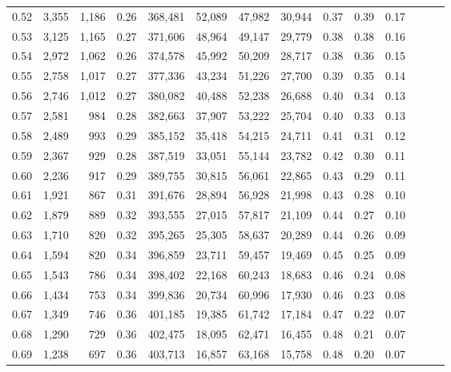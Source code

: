 \begin{tabular}{rrrrrrrrrrrrrr}
0.52 &   3,355 &  1,186 &  0.26 &  368,481 &   52,089 &  47,982 &  30,944 &  0.37 &  0.39 &      0.17 \\
0.53 &   3,125 &  1,165 &  0.27 &  371,606 &   48,964 &  49,147 &  29,779 &  0.38 &  0.38 &      0.16 \\
0.54 &   2,972 &  1,062 &  0.26 &  374,578 &   45,992 &  50,209 &  28,717 &  0.38 &  0.36 &      0.15 \\
0.55 &   2,758 &  1,017 &  0.27 &  377,336 &   43,234 &  51,226 &  27,700 &  0.39 &  0.35 &      0.14 \\
0.56 &   2,746 &  1,012 &  0.27 &  380,082 &   40,488 &  52,238 &  26,688 &  0.40 &  0.34 &      0.13 \\
0.57 &   2,581 &    984 &  0.28 &  382,663 &   37,907 &  53,222 &  25,704 &  0.40 &  0.33 &      0.13 \\
0.58 &   2,489 &    993 &  0.29 &  385,152 &   35,418 &  54,215 &  24,711 &  0.41 &  0.31 &      0.12 \\
0.59 &   2,367 &    929 &  0.28 &  387,519 &   33,051 &  55,144 &  23,782 &  0.42 &  0.30 &      0.11 \\
0.60 &   2,236 &    917 &  0.29 &  389,755 &   30,815 &  56,061 &  22,865 &  0.43 &  0.29 &      0.11 \\
0.61 &   1,921 &    867 &  0.31 &  391,676 &   28,894 &  56,928 &  21,998 &  0.43 &  0.28 &      0.10 \\
0.62 &   1,879 &    889 &  0.32 &  393,555 &   27,015 &  57,817 &  21,109 &  0.44 &  0.27 &      0.10 \\
0.63 &   1,710 &    820 &  0.32 &  395,265 &   25,305 &  58,637 &  20,289 &  0.44 &  0.26 &      0.09 \\
0.64 &   1,594 &    820 &  0.34 &  396,859 &   23,711 &  59,457 &  19,469 &  0.45 &  0.25 &      0.09 \\
0.65 &   1,543 &    786 &  0.34 &  398,402 &   22,168 &  60,243 &  18,683 &  0.46 &  0.24 &      0.08 \\
0.66 &   1,434 &    753 &  0.34 &  399,836 &   20,734 &  60,996 &  17,930 &  0.46 &  0.23 &      0.08 \\
0.67 &   1,349 &    746 &  0.36 &  401,185 &   19,385 &  61,742 &  17,184 &  0.47 &  0.22 &      0.07 \\
0.68 &   1,290 &    729 &  0.36 &  402,475 &   18,095 &  62,471 &  16,455 &  0.48 &  0.21 &      0.07 \\
0.69 &   1,238 &    697 &  0.36 &  403,713 &   16,857 &  63,168 &  15,758 &  0.48 &  0.20 &      0.07 \\

\end{tabular}
